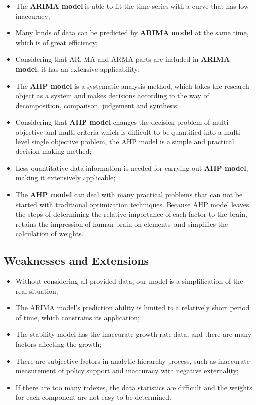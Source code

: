 \documentclass{mcmthesis}
\begin{document}
\begin{itemize}
  \item The {\bf{ARIMA model}} is able to fit the time series with a curve that has low inaccuracy;
  \item Many kinds of data can be predicted by {\bf{ARIMA model}} at the same time, which is of great efficiency;
  \item Considering that AR, MA and ARMA parts are included in {\bf{ARIMA model}}, it has an  extensive applicability;
  \item The {\bf{AHP model}} is a systematic analysis method, which takes the research object as a system and makes decisions according to the way of decomposition, comparison, judgement and synthesis;
  \item Considering that {\bf{AHP model}} changes the decision problem of multi-objective and multi-criteria which is difficult to be quantified into a multi-level single objective problem, the AHP model is a simple and practical decision making method;
  \item Less quantitative data information is needed for carrying out {\bf{AHP model}}, making it extensively applicable;
   \item The {\bf{AHP model}} can deal with many practical problems that can not be started with traditional optimization techniques. Because AHP model leaves the steps of determining the relative importance of each factor to the brain, retains the impression of human brain on elements, and simplifies the calculation of weights.
\end{itemize}

\subsection{Weaknesses and Extensions}
\begin{itemize}
  \item Without considering all provided data, our model is a simplification of the real situation;
  \item The ARIMA model's prediction ability is limited to a relatively short period of time, which constrains its application;
  \item The stability model has the inaccurate growth rate data, and there are many factors affecting the growth;
  \item There are subjective factors in analytic hierarchy process, such as inaccurate measurement of policy support and inaccuracy with negative externality;
  \item If there are too many indexes, the data statistics are difficult and the weights for each component are not easy to be determined.
\end{itemize}
\end{document}
